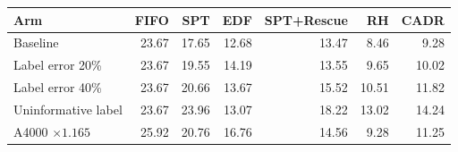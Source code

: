 \begin{tabular}{lrrrrrr}
\toprule
Arm & FIFO & SPT & EDF & SPT+Rescue & RH & CADR \\
\midrule
Baseline & 23.67 & 17.65 & 12.68 & 13.47 & 8.46 & 9.28 \\
Label error 20\% & 23.67 & 19.55 & 14.19 & 13.55 & 9.65 & 10.02 \\
Label error 40\% & 23.67 & 20.66 & 13.67 & 15.52 & 10.51 & 11.82 \\
Uninformative label & 23.67 & 23.96 & 13.07 & 18.22 & 13.02 & 14.24 \\
A4000 $\times 1.165$ & 25.92 & 20.76 & 16.76 & 14.56 & 9.28 & 11.25 \\
\bottomrule
\end{tabular}
